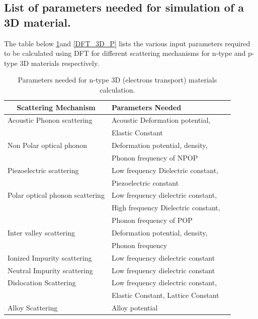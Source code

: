\documentclass[12pt]{article}
\begin{document}
\subsection{List of parameters needed for simulation of a 3D material.}  
The table below \ref{DFT_3D_N}and \ref{DFT_3D_P} lists the various input parameters required to be calculated using DFT for different scattering mechanisms for n-type and p-type 3D materials respectively.

\begin{table} [H]
\centering
\caption{Parameters needed for n-type 3D (electrons transport) materials calculation.}
\label{DFT_3D_N}
\begin{tabular}{|l|l|l|}
\hline
\multicolumn{1}{|c|}{\textbf{Scattering Mechanism}} & {\textbf{Parameters Needed}} \\
\hline                                      
Acoustic Phonon scattering   & Acoustic Deformation potential, \\
 &  Elastic Constant \\
\hline   
Non Polar optical phonon  & Deformation potential, density, \\
 & Phonon frequency of NPOP \\
\hline  
Piezoelectric scattering & Low frequency Dielectric constant,  \\
 & Piezoelectric constant  \\
\hline
Polar optical phonon
scattering & Low frequency dielectric constant, \\
 & High frequency Dielectric constant, \\ 
 & Phonon frequency of POP \\
\hline
Inter valley scattering & Deformation potential, density, \\ 
 & Phonon frequency \\
\hline
Ionized Impurity scattering & Low frequency dielectric constant \\
\hline
Neutral Impurity scattering & Low frequency dielectric constant \\
\hline
Dislocation Scattering & Low frequency dielectric constant, \\
 &  Elastic Constant, Lattice Constant \\
\hline
Alloy Scattering & Alloy potential \\
\hline

\end{tabular}
\end{table}
\end{document}
